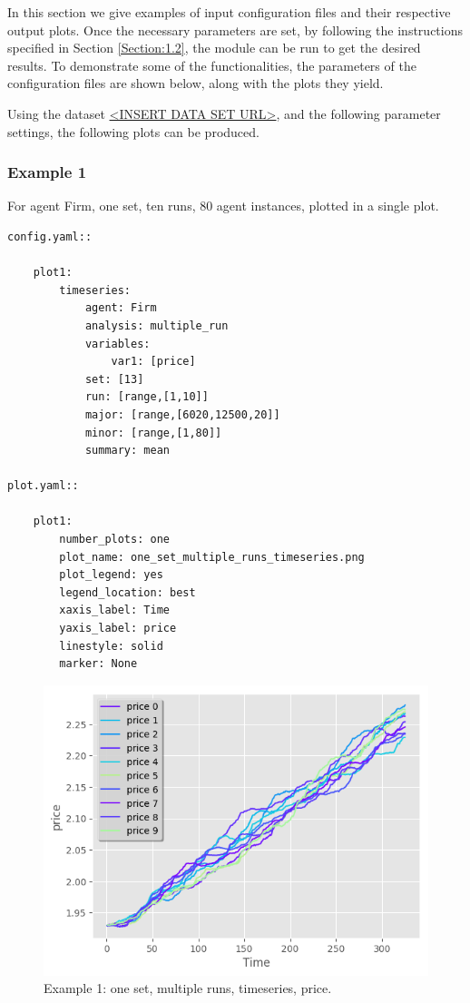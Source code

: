 \documentclass[10pt,a4paper]{article}
\begin{document}
In this section we give examples of input configuration files and their respective output plots.
Once the necessary parameters are set, by following the instructions specified in Section \ref{Section:1.2}, the module can be run to get the desired results. To demonstrate some of the functionalities, the parameters of the configuration files are shown below, along with the plots they yield.

Using the dataset \url{<INSERT DATA SET URL>}, and the following parameter settings, the following plots can be produced.

\clearpage
\subsubsection{Example 1}
For agent Firm, one set, ten runs, 80 agent instances, plotted in a single plot.

\begin{lstlisting}
config.yaml::

    plot1:
        timeseries:
            agent: Firm
            analysis: multiple_run
            variables:
                var1: [price]
            set: [13]
            run: [range,[1,10]]
            major: [range,[6020,12500,20]]
            minor: [range,[1,80]] 
            summary: mean

plot.yaml::

    plot1:
        number_plots: one
        plot_name: one_set_multiple_runs_timeseries.png
        plot_legend: yes
        legend_location: best
        xaxis_label: Time
        yaxis_label: price
        linestyle: solid
        marker: None
\end{lstlisting}

\begin{figure}[b!]\centering\leavevmode
\includegraphics[scale=.7]{./plots_tut_2/one_set_multiple_runs_timeseries_price.png} 
\caption{\footnotesize  Example 1: one set, multiple runs, timeseries, price.}
\end{figure}
\end{document}
